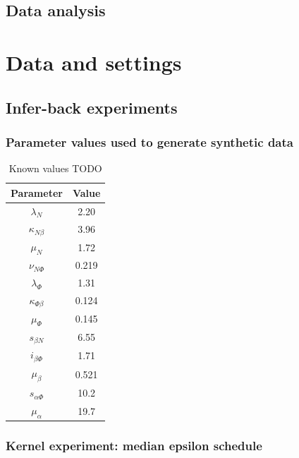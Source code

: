 \section{Data analysis}

\chapter{Data and settings}






\section{Infer-back experiments}

\subsection{Parameter values used to generate synthetic data}

\begin{table}[H]
    \centering
    \begin{tabular}{|c c|}
        \hline
        Parameter            & Value \\[0.5ex]
        \hline\hline
        $\lambda_N$          & 2.20  \\
        $\kappa_{N\beta}$    & 3.96  \\
        $\mu_N$              & 1.72  \\
        $\nu_{N\Phi}$        & 0.219 \\
        \hline
        $\lambda_\Phi$       & 1.31 \\
        $\kappa_{\Phi\beta}$ & 0.124 \\
        $\mu_\Phi$           & 0.145 \\
        \hline
        $s_{\beta N}$        & 6.55  \\
        $i_{\beta\Phi}$ & 1.71 \\
        $\mu_\beta$          & 0.521  \\
        \hline
        $s_{\alpha\Phi}$     & 10.2 \\
        $\mu_\alpha$         & 19.7  \\
        \hline
    \end{tabular}
    \caption[TODO]
    {Known values TODO}
    \label{table:known_values}
\end{table}

\subsection{Kernel experiment: median epsilon schedule}

